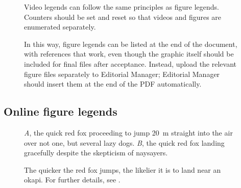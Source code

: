 \documentclass[11pt]{article}
\begin{document}
\begin{figure}[h!]
\caption{Video legends can follow the same principles as figure legends. Counters should be set and reset so that videos and figures are enumerated separately.}
\label{VideoExample}
\end{figure}

\renewcommand{\figurename}{Figure}
\setcounter{figure}{1}



\begin{figure}[h!]
\caption{In this way, figure legends can be listed at the end of the document, with references that work, even though the graphic itself should be included for final files after acceptance. Instead, upload the relevant figure files separately to Editorial Manager; Editorial Manager should insert them at the end of the PDF automatically.}
\label{Fig:AnotherFigure}
\end{figure}

\subsection*{Online figure legends}

\renewcommand{\thefigure}{A\arabic{figure}}
\setcounter{figure}{0}

\begin{figure}[h!]
\caption{\textit{A}, the quick red fox proceeding to jump 20~m straight into the air over not one, but several lazy dogs. \textit{B}, the quick red fox landing gracefully despite the skepticism of naysayers.}
\label{Fig:Jumps}
\end{figure}

\begin{figure}[h!]
\caption{The quicker the red fox jumps, the likelier it is to land near an okapi. For further details, see \citet{LemKapEx07}.}
\label{Fig:JumpsOk}
\end{figure}

\renewcommand{\thefigure}{B\arabic{figure}}
\setcounter{figure}{0}
\end{document}
